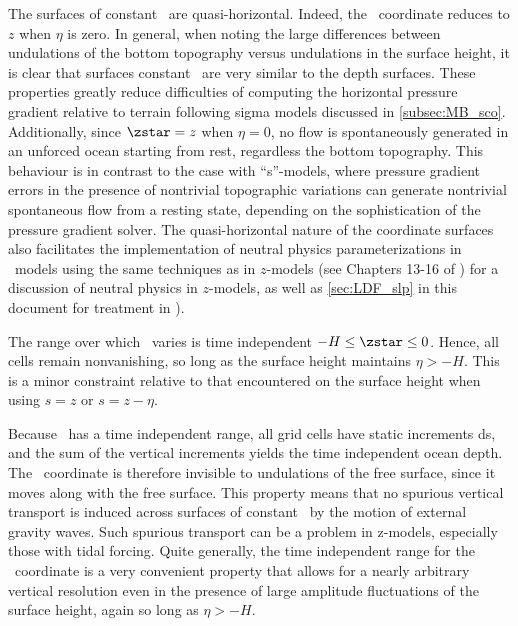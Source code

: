 \documentclass[../main/NEMO_manual]{subfiles}
\begin{document}
The surfaces of constant \zstar\ are quasi-horizontal.
Indeed, the \zstar\ coordinate reduces to $z$ when $\eta$ is zero.
In general, when noting the large differences between
undulations of the bottom topography versus undulations in the surface height,
it is clear that surfaces constant \zstar\ are very similar to the depth surfaces.
These properties greatly reduce difficulties of computing the horizontal pressure gradient relative to
terrain following sigma models discussed in \autoref{subsec:MB_sco}.
Additionally, since $\zstar = z$ when $\eta = 0$,
no flow is spontaneously generated in an unforced ocean starting from rest,
regardless the bottom topography.
This behaviour is in contrast to the case with ``s''-models,
where pressure gradient errors in the presence of nontrivial topographic variations can generate
nontrivial spontaneous flow from a resting state,
depending on the sophistication of the pressure gradient solver.
The quasi-horizontal nature of the coordinate surfaces also facilitates the implementation of
neutral physics parameterizations in \zstar\ models using the same techniques as in $z$-models
(see Chapters 13-16 of \cite{griffies_bk04}) for a discussion of neutral physics in $z$-models,
as well as \autoref{sec:LDF_slp} in this document for treatment in \NEMO).

The range over which \zstar\ varies is time independent $-H \leq \zstar \leq 0$.
Hence, all cells remain nonvanishing, so long as the surface height maintains $\eta > -H$.
This is a minor constraint relative to that encountered on the surface height when
using $s = z$ or $s = z - \eta$.

Because \zstar\ has a time independent range, all grid cells have static increments ds,
and the sum of the vertical increments yields the time independent ocean depth. %
The \zstar\ coordinate is therefore invisible to undulations of the free surface,
since it moves along with the free surface.
This property means that no spurious vertical transport is induced across
surfaces of constant \zstar\  by the motion of external gravity waves.
Such spurious transport can be a problem in z-models, especially those with tidal forcing.
Quite generally,
the time independent range for the \zstar\ coordinate is a very convenient property that
allows for a nearly arbitrary vertical resolution even in
the presence of large amplitude fluctuations of the surface height, again so long as $\eta > -H$.

\end{document}
